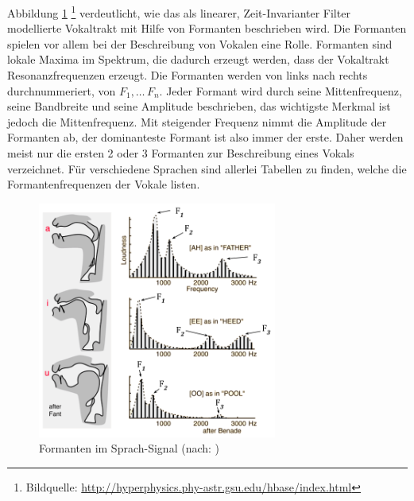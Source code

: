 Abbildung \ref{img:formants} \footnote{Bildquelle: \url{http://hyperphysics.phy-astr.gsu.edu/hbase/index.html}} verdeutlicht, wie das als linearer, Zeit-Invarianter Filter modellierte Vokaltrakt mit Hilfe von Formanten beschrieben wird. Die Formanten spielen vor allem bei der Beschreibung von Vokalen eine Rolle. Formanten sind lokale Maxima im Spektrum, die dadurch erzeugt werden, dass der Vokaltrakt Resonanzfrequenzen erzeugt. Die Formanten werden von links nach rechts durchnummeriert, von $F_1 ,\ldots\,F_n$. Jeder Formant wird durch seine Mittenfrequenz, seine Bandbreite und seine Amplitude beschrieben, das wichtigste Merkmal ist jedoch die Mittenfrequenz. Mit steigender Frequenz nimmt die Amplitude der Formanten ab, der dominanteste Formant ist also immer der erste. Daher werden meist nur die ersten 2 oder 3 Formanten zur Beschreibung eines Vokals verzeichnet. Für verschiedene Sprachen sind allerlei Tabellen zu finden, welche die Formantenfrequenzen der Vokale listen.\cite[S. 19]{sprachverarbeitung}

\begin{figure}[h]
	\centering
	\includegraphics[width=0.7\textwidth]{bilder/formants02.png}
	\caption{Formanten im Sprach-Signal (nach: \cite{benade})}
	\label{img:formants}
\end{figure}	

